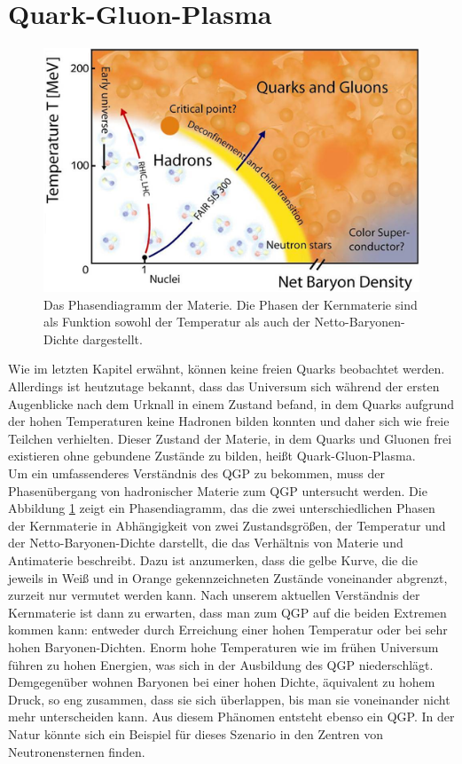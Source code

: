 \documentclass[12pt,a4paper]{report}
\begin{document}
\section{Quark-Gluon-Plasma}
\label{sec:QGP}
\begin{figure}
\centering
\includegraphics[width=13cm]{Phasenuebergang.png} 
\caption{Das Phasendiagramm der Materie. Die Phasen der Kernmaterie sind als Funktion sowohl der Temperatur als auch der Netto-Baryonen-Dichte dargestellt.}
\label{Phasenuebergang}
\end{figure}
Wie im letzten Kapitel erwähnt, können keine freien Quarks beobachtet werden. Allerdings ist heutzutage bekannt, dass das Universum sich während der ersten Augenblicke nach dem Urknall in einem Zustand befand, in dem Quarks aufgrund der hohen Temperaturen keine Hadronen bilden konnten und daher sich wie freie Teilchen verhielten. Dieser Zustand der Materie, in dem Quarks und Gluonen frei existieren ohne gebundene Zustände zu bilden, heißt Quark-Gluon-Plasma. \\
Um ein umfassenderes Verständnis des QGP zu bekommen, muss der Phasenübergang von hadronischer Materie zum QGP untersucht werden. Die Abbildung \ref{Phasenuebergang} zeigt ein Phasendiagramm, das die zwei unterschiedlichen Phasen der Kernmaterie in Abhängigkeit von zwei Zustandsgrößen, der Temperatur und der Netto-Baryonen-Dichte darstellt, die das Verhältnis von Materie und Antimaterie beschreibt. Dazu ist anzumerken, dass die gelbe Kurve, die die jeweils in Weiß und in Orange gekennzeichneten Zustände voneinander abgrenzt, zurzeit nur vermutet werden kann. Nach unserem aktuellen Verständnis der Kernmaterie ist dann zu erwarten, dass man zum QGP auf die beiden Extremen kommen kann: entweder durch Erreichung einer hohen Temperatur oder bei sehr hohen Baryonen-Dichten. Enorm hohe Temperaturen wie im frühen Universum führen zu hohen Energien, was sich in der Ausbildung des QGP niederschlägt. Demgegenüber wohnen Baryonen bei einer hohen Dichte, äquivalent zu hohem Druck, so eng zusammen, dass sie sich überlappen, bis man sie voneinander nicht mehr unterscheiden kann. Aus diesem Phänomen entsteht ebenso ein QGP. In der Natur könnte sich ein Beispiel für dieses Szenario in den Zentren von Neutronensternen finden.\\
\end{document}
